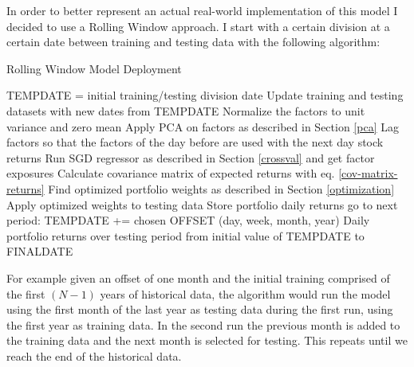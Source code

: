 In order to better represent an actual real-world implementation of this model I decided to use a Rolling Window approach. I start with a certain division at a certain date between training and testing data with the following algorithm:
\begin{algorithm}[H]
	\caption{Rolling Window Model Deployment}
	\begin{algorithmic}[1]
		\STATE TEMPDATE = initial training/testing division date
		\STATE Update training and testing datasets with new dates from TEMPDATE
		\STATE Normalize the factors to unit variance and zero mean
		\STATE Apply PCA on factors as described in Section \ref{pca}
		\STATE Lag factors so that the factors of the day before are used with the next day stock returns
		\STATE Run SGD regressor as described in Section \ref{crossval} and get factor exposures
		\STATE Calculate covariance matrix of expected returns with eq. \eqref{cov-matrix-returns}
		\STATE Find optimized portfolio weights as described in Section \ref{optimization}
		\STATE Apply optimized weights to testing data
		\STATE Store portfolio daily returns
		\STATE go to next period: TEMPDATE += chosen OFFSET (day, week, month, year)
		\ENDWHILE
		\RETURN Daily portfolio returns over testing period from initial value of TEMPDATE to FINALDATE
	\end{algorithmic}
\end{algorithm}


For example given an offset of one month and the initial training comprised of the first $(N - 1)$ years of historical data, the algorithm would run the model using the first month of the last year as testing data during the first run, using the first year as training data. In the second run the previous month is added to the training data and the next month is selected for testing. This repeats until we reach the end of the historical data.